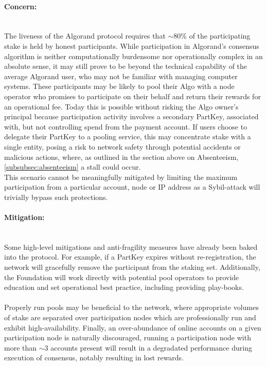 \documentclass[11pt,a4paper]{article}
\begin{document}
\paragraph{Concern:} \mbox{}\\
The liveness of the Algorand protocol requires that $\sim$80\% of the participating stake is held by honest 
participants. While participation in Algorand's consensus algorithm is neither computationally burdensome nor 
operationally complex in an absolute sense, it may still prove to be beyond the technical capability of the average 
Algorand user, who may not be familiar with managing computer systems. These participants may be likely to pool their 
Algo with a node operator who promises to participate on their behalf and return their rewards for an operational fee. 
Today this is possible without risking the Algo owner’s principal because participation activity involves a secondary 
\gls{PartKey}, associated with, but not controlling spend from the payment account. If users choose to delegate their 
\gls{PartKey} to a pooling service, this may concentrate stake with a single entity, posing a risk to network safety 
through potential accidents or malicious actions, where, as outlined in the section above on Absenteeism, 
\ref{subsubsec:absenteeism} a stall could occur. \\ 

This scenario cannot be meaningfully mitigated by limiting the maximum participation from a particular account, 
node or IP address as a Sybil-attack will trivially bypass such protections.

\paragraph{Mitigation:} \mbox{}\\
Some high-level mitigations and anti-fragility measures have already been baked into the protocol. For example, if a
\gls{PartKey} expires without re-registration, the network will gracefully remove the participant from the staking set.
Additionally, the Foundation will work directly with potential pool operators to provide education and set operational
best practice, including providing play-books. \\ \\
Properly run pools may be beneficial to the network, where appropriate volumes of stake are separated over
participation nodes which are professionally run and exhibit high-availability. Finally, an over-abundance of online 
accounts on a given participation node is naturally discouraged, running a participation node with more than $\sim$3 
accounts present will result in a degradated performance during execution of consensus, notably resulting in lost 
rewards.
\end{document}
